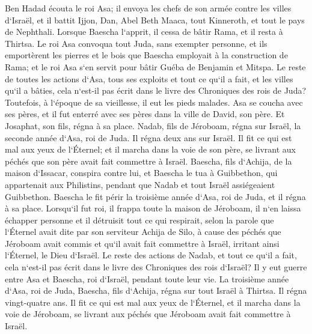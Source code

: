 \verse Ben Hadad écouta le roi Asa; il envoya les chefs de son armée contre les villes d`Israël, et il battit Ijjon, Dan, Abel Beth Maaca, tout Kinneroth, et tout le pays de Nephthali. 
\verse Lorsque Baescha l`apprit, il cessa de bâtir Rama, et il resta à Thirtsa. 
\verse Le roi Asa convoqua tout Juda, sans exempter personne, et ils emportèrent les pierres et le bois que Baescha employait à la construction de Rama; et le roi Asa s`en servit pour bâtir Guéba de Benjamin et Mitspa. 
\verse Le reste de toutes les actions d`Asa, tous ses exploits et tout ce qu`il a fait, et les villes qu`il a bâties, cela n`est-il pas écrit dans le livre des Chroniques des rois de Juda? Toutefois, à l`époque de sa vieillesse, il eut les pieds malades. 
\verse Asa se coucha avec ses pères, et il fut enterré avec ses pères dans la ville de David, son père. Et Josaphat, son fils, régna à sa place. 
\verse Nadab, fils de Jéroboam, régna sur Israël, la seconde année d`Asa, roi de Juda. Il régna deux ans sur Israël. 
\verse Il fit ce qui est mal aux yeux de l`Éternel; et il marcha dans la voie de son père, se livrant aux péchés que son père avait fait commettre à Israël. 
\verse Baescha, fils d`Achija, de la maison d`Issacar, conspira contre lui, et Baescha le tua à Guibbethon, qui appartenait aux Philistins, pendant que Nadab et tout Israël assiégeaient Guibbethon. 
\verse Baescha le fit périr la troisième année d`Asa, roi de Juda, et il régna à sa place. 
\verse Lorsqu`il fut roi, il frappa toute la maison de Jéroboam, il n`en laissa échapper personne et il détruisit tout ce qui respirait, selon la parole que l`Éternel avait dite par son serviteur Achija de Silo, 
\verse à cause des péchés que Jéroboam avait commis et qu`il avait fait commettre à Israël, irritant ainsi l`Éternel, le Dieu d`Israël. 
\verse Le reste des actions de Nadab, et tout ce qu`il a fait, cela n`est-il pas écrit dans le livre des Chroniques des rois d`Israël? 
\verse Il y eut guerre entre Asa et Baescha, roi d`Israël, pendant toute leur vie. 
\verse La troisième année d`Asa, roi de Juda, Baescha, fils d`Achija, régna sur tout Israël à Thirtsa. Il régna vingt-quatre ans. 
\verse Il fit ce qui est mal aux yeux de l`Éternel, et il marcha dans la voie de Jéroboam, se livrant aux péchés que Jéroboam avait fait commettre à Israël. 

